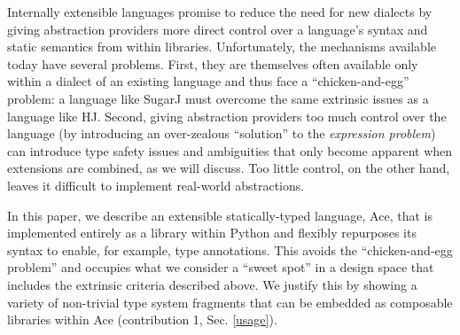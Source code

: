 \documentclass[10pt,preprint]{sigplanconf}
\begin{document}


Internally extensible languages promise to reduce the need for new dialects by giving abstraction providers more direct control over a language's syntax and static semantics from within libraries. %
Unfortunately, the mechanisms available today have several problems. First, they are themselves often available only within a dialect of an existing language and thus face a ``chicken-and-egg'' problem: a language like SugarJ \cite{erdweg2011sugarj} must overcome the same extrinsic issues as a language like HJ. Second, giving abstraction providers too much control over the language (by introducing an over-zealous ``solution'' to the \emph{expression problem}) can introduce type safety issues and ambiguities that only become apparent when extensions are combined, as we will discuss. Too little control, on the other hand, leaves it difficult to implement real-world abstractions.%

In this paper, we describe an extensible statically-typed language, Ace, that is implemented entirely as a library within Python and flexibly repurposes its syntax to enable, for example, type annotations. This avoids the ``chicken-and-egg problem'' and occupies what we consider a ``sweet spot'' in a design space that includes the extrinsic criteria described above. We justify this by showing a variety of non-trivial type system fragments that can be embedded as composable libraries within Ace (contribution 1, Sec. \ref{usage}). 
\end{document}

